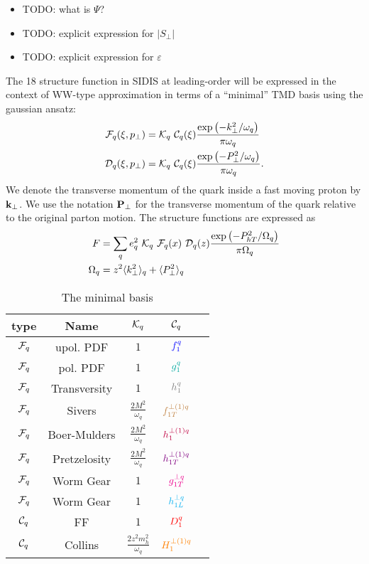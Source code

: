 \documentclass[floatfix,aps,prd,nofootinbib,superscriptaddress,preprint]{revtex4}
\newcommand\3[1]{\boldsymbol{#1}}
\newcommand{\bfkperp}{{\bf k}_\perp}
\newcommand{\bfpperp}{{\bf P}_\perp}
\newcommand{\Phperp}{P_{hT}}
\begin{document}
\begin{itemize}
\item {\color{red} TODO: what is $\Psi$?}
\item {\color{red} TODO: explicit expression for $|S_{\perp}|$}
\item {\color{red} TODO: explicit expression for $\varepsilon$}
\end{itemize}

The 18 structure function in SIDIS at leading-order will be expressed
in the context of WW-type approximation in terms of a ``minimal''
TMD basis using the gaussian ansatz:
%
\begin{align}
{\cal F}_q(\xi,p_{\perp})&={\cal K}_q ~ {\cal C}_q(\xi) \frac{\exp\left(-k_{\perp}^2/\omega_q\right)}{\pi \omega_q}\\
{\cal D}_q(\xi,p_{\perp})&={\cal K}_q ~ {\cal C}_q(\xi) \frac{\exp\left(-P_{\perp}^2/\omega_q\right)}{\pi \omega_q}.
\end{align}
%
We denote the transverse momentum of the quark inside a fast moving
proton by $\bfkperp$. We use the notation $\bfpperp$ for the
transverse momentum of the quark relative to the original parton
motion. The structure functions are expressed as
%
\begin{align}
F&=\sum_q e_q^2 ~ {\cal K}_q ~ {\cal F}_q(x) ~{\cal D}_q(z) \frac{\exp\left(-\Phperp^2/\Omega_q\right)}{\pi \Omega_q}\\
\Omega_q&=z^2\avk + \avp
\end{align}

%

\begin{table}[h!]
\begin{tabular}{|c|c|c|c|c|}
\hline
type       & Name         & ${\cal K}_q$                  & ${\cal C}_q$    \\\hline
${\cal F}_q$ & upol. PDF    & $1$                           & ${\color{blue} f_1^q}$          \\\hline
${\cal F}_q$ & pol. PDF     & $1$                           & $\ppdf$         \\\hline
${\cal F}_q$ & Transversity & $1$                           & $\transversity$ \\\hline
${\cal F}_q$ & Sivers       & $\frac{2M^2}{\omega_q}$       & ${\color{brown} f^{\perp(1)q}_{1T}}$       \\\hline
${\cal F}_q$ & Boer-Mulders & $\frac{2M^2}{\omega_q}$       & ${\color{purple} h^{\perp(1)q}_1 }$  \\\hline
${\cal F}_q$ & Pretzelosity & $\frac{2M^2}{\omega_q}$       & ${\color{violet} h^{\perp(1)q}_{1T} }$ \\\hline
${\cal F}_q$ & Worm Gear    & $1$                           & ${\color{magenta} g^{\perp q}_{1T}}$          \\\hline
${\cal F}_q$ & Worm Gear    & $1$                           & ${\color{cyan}h^{\perp q}_{1L}}$          \\\hline
\hline
${\cal C}_q$ & FF           & $1$                           & ${\color{red} D_1^{q}}$           \\\hline
${\cal C}_q$ & Collins      & $\frac{2z^2 m_h^2}{\omega_q}$ & ${\color{orange} H^{\perp(1)q}_{1} }$      \\\hline
\end{tabular}
\caption{The minimal basis}
\label{t.mbasis}
\end{table}
\end{document}
